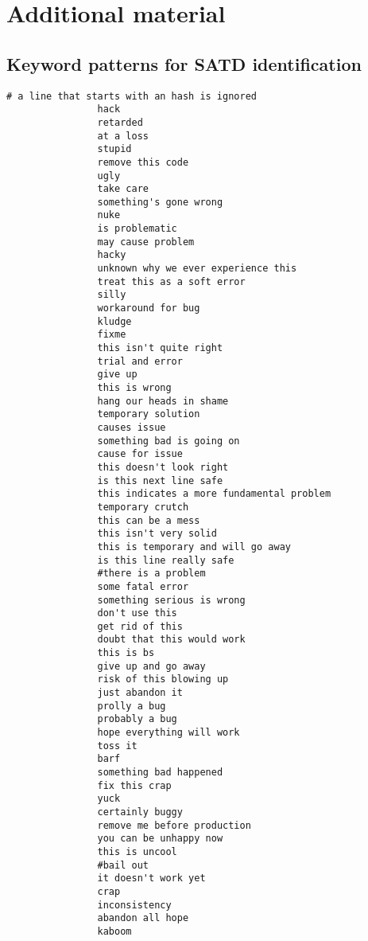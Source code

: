 \chapter{Additional material}

\section{Keyword patterns for SATD identification}

\begin{lstlisting}[caption={61 patterns for SATD detection}, label={lst:patterns61}]
                # a line that starts with an hash is ignored
                hack
                retarded
                at a loss
                stupid
                remove this code
                ugly
                take care
                something's gone wrong
                nuke
                is problematic
                may cause problem
                hacky
                unknown why we ever experience this
                treat this as a soft error
                silly
                workaround for bug
                kludge
                fixme
                this isn't quite right
                trial and error
                give up
                this is wrong
                hang our heads in shame
                temporary solution
                causes issue
                something bad is going on
                cause for issue
                this doesn't look right
                is this next line safe
                this indicates a more fundamental problem
                temporary crutch
                this can be a mess
                this isn't very solid
                this is temporary and will go away
                is this line really safe
                #there is a problem
                some fatal error
                something serious is wrong
                don't use this
                get rid of this
                doubt that this would work
                this is bs
                give up and go away
                risk of this blowing up
                just abandon it
                prolly a bug
                probably a bug
                hope everything will work
                toss it
                barf
                something bad happened
                fix this crap
                yuck
                certainly buggy
                remove me before production
                you can be unhappy now
                this is uncool
                #bail out
                it doesn't work yet
                crap
                inconsistency
                abandon all hope
                kaboom
\end{lstlisting}

